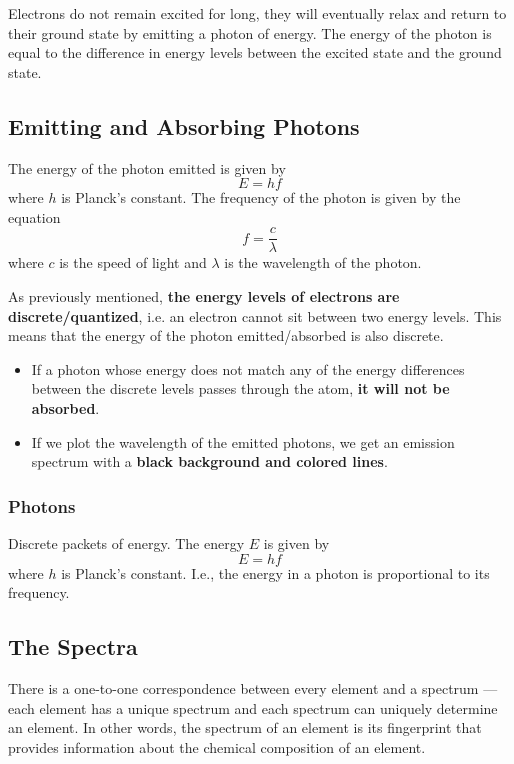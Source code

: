 \documentclass[a4paper,12pt]{article}
\begin{document}
Electrons do not remain excited for long, they will eventually relax and return to their ground state by emitting a photon of energy. The energy of the photon is equal to the difference in energy levels between the excited state and the ground state.

\subsection{Emitting and Absorbing Photons}

The energy of the photon emitted is given by $$E = hf$$where $h$ is Planck's constant. The frequency of the photon is given by the equation $$f = \frac{c}{\lambda}$$where $c$ is the speed of light and $\lambda$ is the wavelength of the photon.

As previously mentioned, \textbf{the energy levels of electrons are discrete/quantized}, i.e. an electron cannot sit between two energy levels. This means that the energy of the photon emitted/absorbed is also discrete.
\begin{itemize}
  \item If a photon whose energy does not match any of the energy differences between the discrete levels passes through the atom, \textbf{it will not be absorbed}.
  \item If we plot the wavelength of the emitted photons, we get an emission spectrum with a \textbf{black background and colored lines}.
\end{itemize}

\subsubsection{Photons}

Discrete packets of energy. The energy $E$ is given by $$E = hf$$where $h$ is Planck's constant. I.e., the energy in a photon is proportional to its frequency.

\pagebreak

\subsection{The Spectra}

There is a one-to-one correspondence between every element and a spectrum --- each element has a unique spectrum and each spectrum can uniquely determine an element. In other words, the spectrum of an element is its fingerprint that provides information about the chemical composition of an element.
\end{document}
